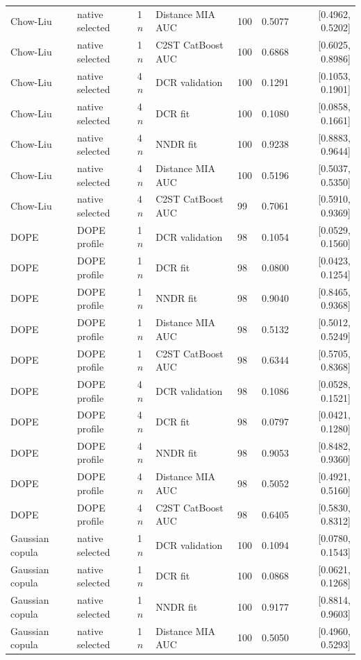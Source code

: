 \begin{longtable}{lllllrr}
Chow-Liu & native selected & 1$n$ & Distance MIA AUC & 100 & 0.5077 & [0.4962, 0.5202] \\
Chow-Liu & native selected & 1$n$ & C2ST CatBoost AUC & 100 & 0.6868 & [0.6025, 0.8986] \\
Chow-Liu & native selected & 4$n$ & DCR validation & 100 & 0.1291 & [0.1053, 0.1901] \\
Chow-Liu & native selected & 4$n$ & DCR fit & 100 & 0.1080 & [0.0858, 0.1661] \\
Chow-Liu & native selected & 4$n$ & NNDR fit & 100 & 0.9238 & [0.8883, 0.9644] \\
Chow-Liu & native selected & 4$n$ & Distance MIA AUC & 100 & 0.5196 & [0.5037, 0.5350] \\
Chow-Liu & native selected & 4$n$ & C2ST CatBoost AUC & 99 & 0.7061 & [0.5910, 0.9369] \\
DOPE & DOPE profile & 1$n$ & DCR validation & 98 & 0.1054 & [0.0529, 0.1560] \\
DOPE & DOPE profile & 1$n$ & DCR fit & 98 & 0.0800 & [0.0423, 0.1254] \\
DOPE & DOPE profile & 1$n$ & NNDR fit & 98 & 0.9040 & [0.8465, 0.9368] \\
DOPE & DOPE profile & 1$n$ & Distance MIA AUC & 98 & 0.5132 & [0.5012, 0.5249] \\
DOPE & DOPE profile & 1$n$ & C2ST CatBoost AUC & 98 & 0.6344 & [0.5705, 0.8368] \\
DOPE & DOPE profile & 4$n$ & DCR validation & 98 & 0.1086 & [0.0528, 0.1521] \\
DOPE & DOPE profile & 4$n$ & DCR fit & 98 & 0.0797 & [0.0421, 0.1280] \\
DOPE & DOPE profile & 4$n$ & NNDR fit & 98 & 0.9053 & [0.8482, 0.9360] \\
DOPE & DOPE profile & 4$n$ & Distance MIA AUC & 98 & 0.5052 & [0.4921, 0.5160] \\
DOPE & DOPE profile & 4$n$ & C2ST CatBoost AUC & 98 & 0.6405 & [0.5830, 0.8312] \\
Gaussian copula & native selected & 1$n$ & DCR validation & 100 & 0.1094 & [0.0780, 0.1543] \\
Gaussian copula & native selected & 1$n$ & DCR fit & 100 & 0.0868 & [0.0621, 0.1268] \\
Gaussian copula & native selected & 1$n$ & NNDR fit & 100 & 0.9177 & [0.8814, 0.9603] \\
Gaussian copula & native selected & 1$n$ & Distance MIA AUC & 100 & 0.5050 & [0.4960, 0.5293] \\

\end{longtable}
